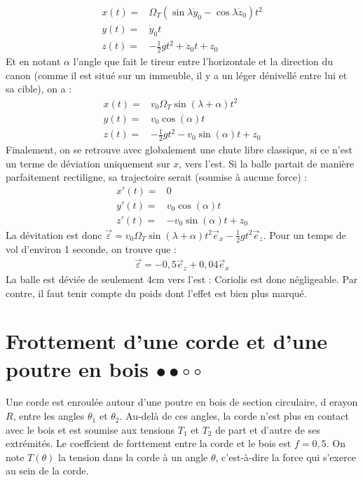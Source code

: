 \begin{correction}
\begin{align*}
        x(t)=& \Omega_T(\sin\lambda\dot{y}_0-\cos\lambda\dot{z}_0)t^2\\ 
        y(t)=&\dot{y}_0t \\
        z(t)=&-\frac{1}{2} gt^2 + \dot{z}_0t+z_0
	\end{align*}	
Et en notant $\alpha$ l'angle que fait le tireur entre l'horizontale et la direction du canon (comme il est situé sur un immeuble, il y a un léger dénivellé entre lui et sa cible), on a :
	\begin{align*}
        x(t)=& v_0\Omega_T\sin(\lambda+\alpha)t^2\\ 
        y(t)=&v_0\cos(\alpha)t \\
        z(t)=&-\frac{1}{2} gt^2 -v_0\sin(\alpha)t+z_0
	\end{align*}	
Finalement, on se retrouve avec globalement une chute libre classique, si ce n'est un terme de déviation uniquement sur $x$, vers l'est. Si la balle partait de manière parfaitement rectiligne, sa trajectoire serait (soumise à aucune force) :
	\begin{align*}
        x'(t)=& 0\\ 
        y'(t)=&v_0\cos(\alpha)t \\
        z'(t)=& -v_0\sin(\alpha)t+z_0
	\end{align*}	
La dévitation est donc $\vec{\varepsilon	}=v_0\Omega_T\sin(\lambda+\alpha)t^2\vec{e}_x-\frac{1}{2} gt^2\vec{e}_z$. Pour un temps de vol d'environ 1 seconde, on trouve que :
\begin{align*}
	\vec{\varepsilon}=-0,5\vec{e}_z+0,04\vec{e}_x
\end{align*}
La balle est déviée de seulement 4cm vers l'est : Coriolis est donc négligeable. Par contre, il faut tenir compte du poids dont l'effet est bien plus marqué. 
	
\end{correction}

\newpage

\section{Frottement d'une corde et d'une poutre en bois $\bullet\bullet\circ\circ$}

Une corde est enroulée autour d'une poutre en bois de section circulaire, d erayon $R$, entre les angles $\theta_1$ et $\theta_2$. Au-delà de ces angles, la corde n'est plus en contact avec le bois et est soumise aux tensions $T_1$ et $T_2$ de part et d'autre de ses extrémités. Le coeffcient de forttement entre la corde et le bois est $f=0,5$. On note $T(\theta)$ la tension dans la corde à un angle $\theta$, c'est-à-dire la force qui s'exerce au sein de la corde.

